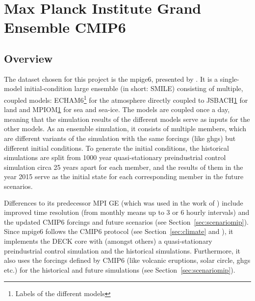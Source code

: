 \chapter{Max Planck Institute Grand Ensemble CMIP6}
\label{ch:dataset}

\section{Overview}

The dataset chosen for this project is the \ac{mpige6}, presented by \citeauthor{olonscheck_new_2023}. 
It is a single-model initial-condition large ensemble (in short: SMILE) consisting of multiple, coupled models: ECHAM6\footnote{\label{fn:modelname}Labels of the different models} for the atmosphere directly coupled to JSBACH\cref{fn:modelname} for land and MPIOM\cref{fn:modelname} for sea and sea-ice. 
The models are coupled once a day, meaning that the simulation results of the different models serve as inputs for the other models.
As an ensemble simulation, it consists of multiple members, which are different variants of the simulation with the same forcings (like \acp{ghg}) but different initial conditions. 
To generate the initial conditions, the historical simulations are split from 1000 year quasi-stationary preindustrial control simulation circa 25 years apart for each member, and the results of them in the year 2015 serve as the initial state for each corresponding member in the future scenarios. \cite{olonscheck_new_2023}

 

Differences to its predecessor MPI GE \cite{maher_max_2019} (which was used in the work of \citeauthor{vietinghoffdiss} \cite{vietinghoffdiss}) include improved time resolution (from monthly means up to 3 or 6 hourly intervals) and the updated CMIP6 forcings and future scenarios (see Section~\ref{sec:scenariomip}). 
Since \ac{mpige6} follows the CMIP6 protocol (see Section~\ref{sec:climate} and \cite{eyring_overview_2016}), it implements the DECK core with (amongst others) a quasi-stationary preindustrial control simulation and the historical simulations.
Furthermore, it also uses the forcings defined by CMIP6 (like volcanic eruptions, solar circle, \acp{ghg} etc.) for the historical and future simulations (see Section~\ref{sec:scenariomip}).




